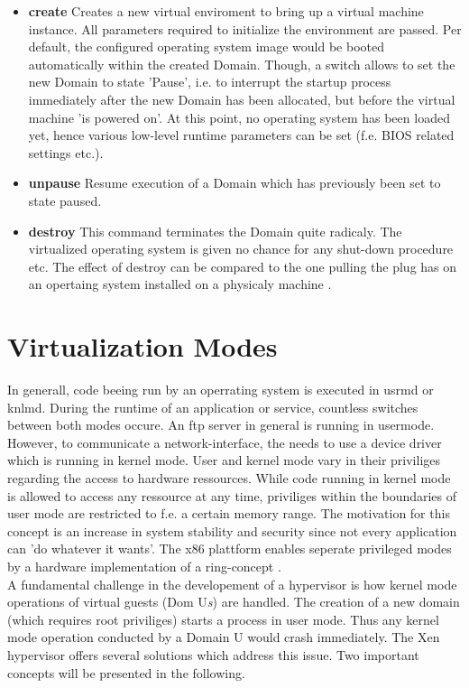 \begin{itemize}
	\item \textbf{create} Creates a new virtual enviroment to bring up a virtual machine instance. All parameters required to initialize the environment are passed. Per default, the configured operating system image would be booted automatically within the created Domain. Though, a switch allows to set the new Domain to state 'Pause', i.e. to interrupt the startup process immediately after the new Domain has been allocated, but before the virtual machine 'is powered on'. At this point, no operating system has been loaded yet, hence various low-level runtime parameters can be set (f.e. \gls{BIOS} related settings etc.).
	\item \textbf{unpause} Resume execution of a Domain which has previously been set to state paused.
	\item \textbf{destroy} This command terminates the Domain quite radicaly. The virtualized operating system is given no chance for any shut-down procedure etc. The effect of destroy can be compared to the one pulling the plug has on an opertaing system installed on a physicaly machine \cite{xenxl}.
\end{itemize}

\section{Virtualization Modes}\label{sec:virt-modes}
In generall, code beeing run by an operrating system is executed in \gls{usrmd} or \gls{knlmd}. During the runtime of an application or service, countless switches between both modes occure. An ftp server in general is running in usermode. However, to communicate a network-interface, the needs to use a device driver which is running in kernel mode. User and kernel mode vary in their priviliges regarding the access to hardware ressources. While code running in kernel mode is allowed to access any ressource at any time, priviliges within the boundaries of user mode are restricted to f.e. a certain memory range. The motivation for this concept is an increase in system stability and security since not every application can 'do whatever it wants'. The x86 plattform enables seperate privileged modes by a hardware implementation of a ring-concept \cite{guide2017intel}.\\
A fundamental challenge in the developement of a hypervisor is how kernel mode operations of virtual guests (Dom U{\small \textit{s}}) are handled. The creation of a new domain (which requires \gls{root} priviliges) starts a process in user mode. Thus any kernel mode operation conducted by a Domain U would crash immediately. The Xen hypervisor offers several solutions which address this issue. Two important concepts will be presented in the following.  

